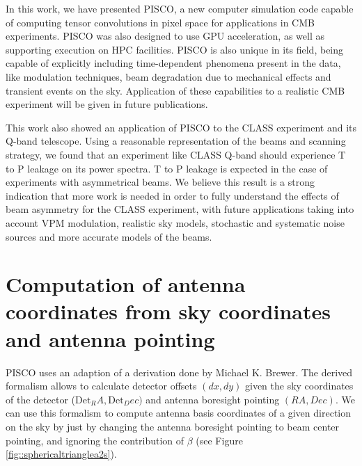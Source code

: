 \documentclass[a4paper,fleqn]{cas-dc}\sloppy
\begin{document}
In this work, we have presented PISCO, a new computer simulation code capable of computing tensor convolutions in pixel space for applications in CMB experiments. PISCO was also designed to use GPU acceleration, as well as supporting execution on HPC facilities. PISCO is also unique in its field, being capable of explicitly including time-dependent phenomena present in the data, like modulation techniques, beam degradation due to mechanical effects and transient events on the sky. Application of these capabilities to a realistic CMB experiment will be given in future publications.

This work also showed an application of PISCO to the CLASS experiment and its Q-band telescope. Using a reasonable representation of the beams and scanning strategy, we found that an experiment like CLASS Q-band should experience T to P leakage on its power spectra. T to P leakage is expected in the case of experiments with asymmetrical beams. We believe this result is a strong indication that more work is needed in order to fully understand the effects of beam asymmetry for the CLASS experiment, with future applications taking into account VPM modulation, realistic sky models, stochastic and systematic noise sources and more accurate models of the beams.





\appendix
\section{Computation of antenna coordinates from sky coordinates and antenna pointing}

PISCO uses an adaption of a derivation done by Michael K. Brewer. The derived formalism allows to calculate detector offsets $(dx,dy)$ given the sky coordinates of the detector ($\mathrm{Det}_RA,\mathrm{Det}_Dec)$ and antenna boresight pointing $(RA,Dec)$. We can use this formalism to compute antenna basis coordinates of a given direction on the sky by just by changing the antenna boresight pointing to beam center pointing, and ignoring the contribution of $\beta$ (see Figure \ref{fig::sphericaltrianglea2s}).
\end{document}
